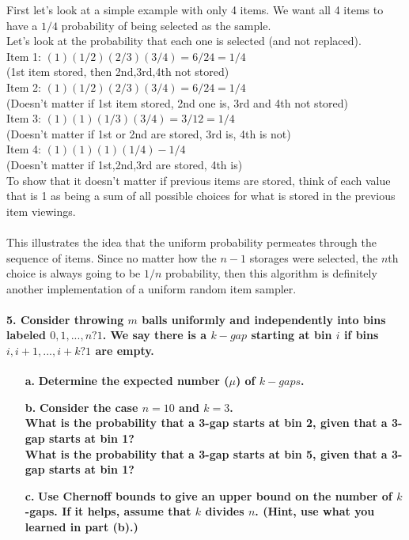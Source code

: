 \documentclass{article}
\begin{document}
First let's look at a simple example with only 4 items. We want all 4 items
to have a $1/4$ probability of being selected as the sample.\\
Let's look at the probability that each one is selected (and not replaced).\\
Item 1: $(1)(1/2)(2/3)(3/4) = 6/24 = 1/4$\\
(1st item stored, then 2nd,3rd,4th not stored)\\
Item 2: $(1)(1/2)(2/3)(3/4) = 6/24 = 1/4$\\
(Doesn't matter if 1st item stored, 2nd one is, 3rd and 4th not stored)\\
Item 3: $(1)(1)(1/3)(3/4) = 3/12 = 1/4$\\
(Doesn't matter if 1st or 2nd are stored, 3rd is, 4th is not)\\
Item 4: $(1)(1)(1)(1/4) - 1/4$\\
(Doesn't matter if 1st,2nd,3rd are stored, 4th is)\\
To show that it doesn't matter if previous items are stored, think
of each value that is 1 as being a sum of all possible choices for what is 
stored in
the previous item viewings.\\\\
This illustrates the idea that the uniform probability permeates through the
sequence of items. Since no matter how the $n-1$ storages were selected, the 
$n$th
choice is always going to be $1/n$ probability, then this algorithm is 
definitely
another implementation of a uniform random item sampler.

\pagebreak

\paragraph{5. Consider throwing $m$ balls uniformly and independently into bins 
labeled $0, 1,..., n?1$. We say there is a $k-gap$ starting at bin $i$ if bins 
$i, i + 1,..., i + k ? 1$ are empty.}
\begin{enumerate}
\item[\textbf{a.}] \textbf{Determine the expected number ($\mu$) of $k-gaps$.}
\item[\textbf{b.}] \textbf{Consider the case $n = 10$ and $k = 3$.\\ 
						   What is the probability that 
a 3-gap starts at bin 2, given that a 3-gap starts at bin 1?\\ 			
			   What is the probability that a 3-gap starts at bin 
5, given that a 3-gap starts at bin 1?}
\item[\textbf{c.}] \textbf{Use Chernoff bounds to give an upper bound on the 
number of $k$-gaps. If it helps, assume that $k$ divides $n$. (Hint, use what 
you learned in part (b).)}
\end{enumerate}
\end{document}
